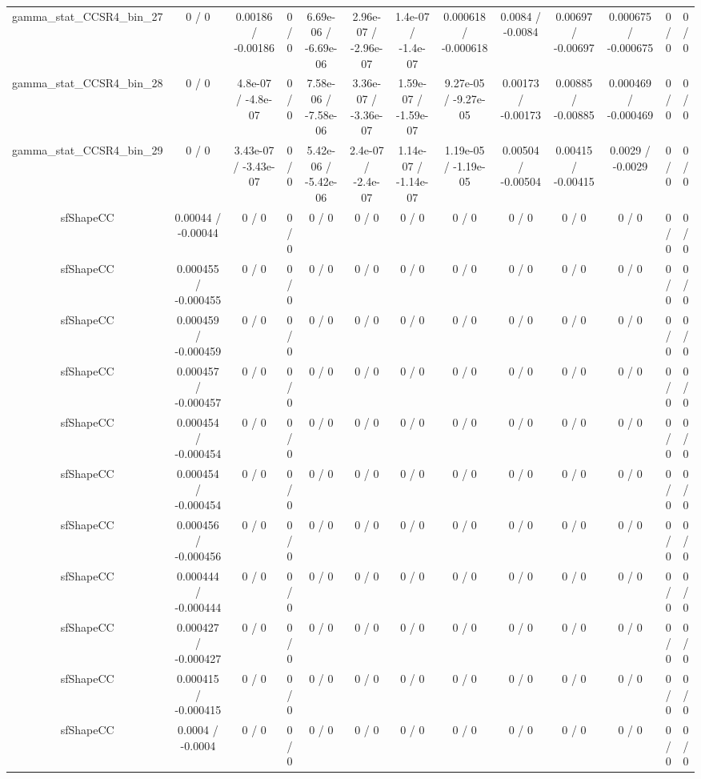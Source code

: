 \documentclass[10pt]{article}
\begin{document}
\begin{table}[htbp]
\begin{center}
\begin{tabular}{|c|c|c|c|c|c|c|c|c|c|c|c|c|}
  gamma_stat_CCSR4_bin_27 & 0 / 0 & 0.00186 / -0.00186 & 0 / 0 & 6.69e-06 / -6.69e-06 & 2.96e-07 / -2.96e-07 & 1.4e-07 / -1.4e-07 & 0.000618 / -0.000618 & 0.0084 / -0.0084 & 0.00697 / -0.00697 & 0.000675 / -0.000675 & 0 / 0 & 0 / 0 \\ 
  gamma_stat_CCSR4_bin_28 & 0 / 0 & 4.8e-07 / -4.8e-07 & 0 / 0 & 7.58e-06 / -7.58e-06 & 3.36e-07 / -3.36e-07 & 1.59e-07 / -1.59e-07 & 9.27e-05 / -9.27e-05 & 0.00173 / -0.00173 & 0.00885 / -0.00885 & 0.000469 / -0.000469 & 0 / 0 & 0 / 0 \\ 
  gamma_stat_CCSR4_bin_29 & 0 / 0 & 3.43e-07 / -3.43e-07 & 0 / 0 & 5.42e-06 / -5.42e-06 & 2.4e-07 / -2.4e-07 & 1.14e-07 / -1.14e-07 & 1.19e-05 / -1.19e-05 & 0.00504 / -0.00504 & 0.00415 / -0.00415 & 0.0029 / -0.0029 & 0 / 0 & 0 / 0 \\ 
  sfShapeCC & 0.00044 / -0.00044 & 0 / 0 & 0 / 0 & 0 / 0 & 0 / 0 & 0 / 0 & 0 / 0 & 0 / 0 & 0 / 0 & 0 / 0 & 0 / 0 & 0 / 0 \\ 
  sfShapeCC & 0.000455 / -0.000455 & 0 / 0 & 0 / 0 & 0 / 0 & 0 / 0 & 0 / 0 & 0 / 0 & 0 / 0 & 0 / 0 & 0 / 0 & 0 / 0 & 0 / 0 \\ 
  sfShapeCC & 0.000459 / -0.000459 & 0 / 0 & 0 / 0 & 0 / 0 & 0 / 0 & 0 / 0 & 0 / 0 & 0 / 0 & 0 / 0 & 0 / 0 & 0 / 0 & 0 / 0 \\ 
  sfShapeCC & 0.000457 / -0.000457 & 0 / 0 & 0 / 0 & 0 / 0 & 0 / 0 & 0 / 0 & 0 / 0 & 0 / 0 & 0 / 0 & 0 / 0 & 0 / 0 & 0 / 0 \\ 
  sfShapeCC & 0.000454 / -0.000454 & 0 / 0 & 0 / 0 & 0 / 0 & 0 / 0 & 0 / 0 & 0 / 0 & 0 / 0 & 0 / 0 & 0 / 0 & 0 / 0 & 0 / 0 \\ 
  sfShapeCC & 0.000454 / -0.000454 & 0 / 0 & 0 / 0 & 0 / 0 & 0 / 0 & 0 / 0 & 0 / 0 & 0 / 0 & 0 / 0 & 0 / 0 & 0 / 0 & 0 / 0 \\ 
  sfShapeCC & 0.000456 / -0.000456 & 0 / 0 & 0 / 0 & 0 / 0 & 0 / 0 & 0 / 0 & 0 / 0 & 0 / 0 & 0 / 0 & 0 / 0 & 0 / 0 & 0 / 0 \\ 
  sfShapeCC & 0.000444 / -0.000444 & 0 / 0 & 0 / 0 & 0 / 0 & 0 / 0 & 0 / 0 & 0 / 0 & 0 / 0 & 0 / 0 & 0 / 0 & 0 / 0 & 0 / 0 \\ 
  sfShapeCC & 0.000427 / -0.000427 & 0 / 0 & 0 / 0 & 0 / 0 & 0 / 0 & 0 / 0 & 0 / 0 & 0 / 0 & 0 / 0 & 0 / 0 & 0 / 0 & 0 / 0 \\ 
  sfShapeCC & 0.000415 / -0.000415 & 0 / 0 & 0 / 0 & 0 / 0 & 0 / 0 & 0 / 0 & 0 / 0 & 0 / 0 & 0 / 0 & 0 / 0 & 0 / 0 & 0 / 0 \\ 
  sfShapeCC & 0.0004 / -0.0004 & 0 / 0 & 0 / 0 & 0 / 0 & 0 / 0 & 0 / 0 & 0 / 0 & 0 / 0 & 0 / 0 & 0 / 0 & 0 / 0 & 0 / 0 \\ 

\end{tabular}
\end{center}
\end{table}
\end{document}
